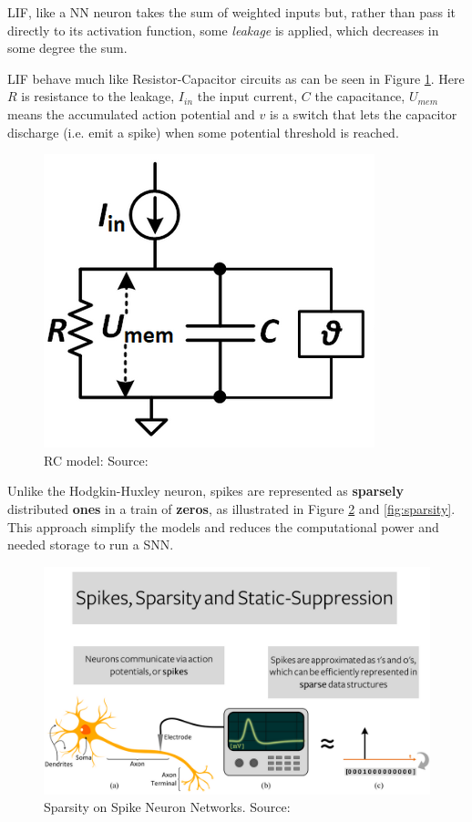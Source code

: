 			\par LIF, like a NN neuron takes the sum of weighted inputs but, rather than pass it directly to its activation function, some \textit{leakage} is applied, which decreases in some degree the sum. 
			\par LIF behave much like Resistor-Capacitor circuits as can be seen in Figure \ref{fig:rcmodel}. Here $R$ is resistance to the leakage, $I_{in}$ the input current, $C$ the capacitance, $U_{mem}$ means the accumulated action potential and $v$ is a switch that lets the capacitor discharge (i.e. emit a spike) when some potential threshold is reached.

			\begin{figure}[H]
				\centering
				\includegraphics[width=0.4\linewidth]{images/rcmodel}
				\caption[The RC model]{RC model: Source: \cite{10242251}}
				\label{fig:rcmodel}
			\end{figure}
			
			\par Unlike the Hodgkin-Huxley neuron, spikes are represented as \textbf{sparsely} distributed \textbf{ones} in a train of \textbf{zeros}, as illustrated in Figure \ref{fig:spikessparsitystaticsupress} and \ref{fig:sparsity}. This approach simplify the models and reduces the computational power and needed storage to run a SNN.\newline
			
			\begin{figure}[H]
				\centering
				\includegraphics[width=\linewidth]{images/spikesSparsityStaticSupress}
				\caption{Sparsity on Spike Neuron Networks. Source: \cite{10242251}}
				\label{fig:spikessparsitystaticsupress}
			\end{figure}

